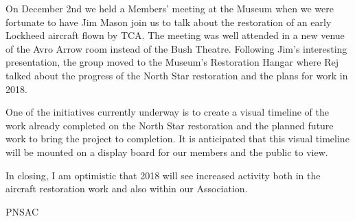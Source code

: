 On December 2nd we held a Members' meeting at the Museum when we were
fortunate to have Jim Mason join us to talk about the restoration of an
early Lockheed aircraft flown by TCA. The meeting was well attended in
a new venue of the Avro Arrow room instead of the Bush Theatre.
Following Jim's interesting presentation, the group moved to the
Museum's Restoration Hangar where Rej talked about the progress of the
North Star restoration and the plans for work in 2018.

One of the initiatives currently underway is to create a visual
timeline of the work already completed on the North Star restoration
and the planned future work to bring the project to completion. It is
anticipated that this visual timeline will be mounted on a display
board for our members and the public to view.

In closing, I am optimistic that 2018 will see increased activity both
in the aircraft restoration work and also within our Association.

\begin{footnotesize}
    \raggedleft PNSAC\\
\end{footnotesize}



